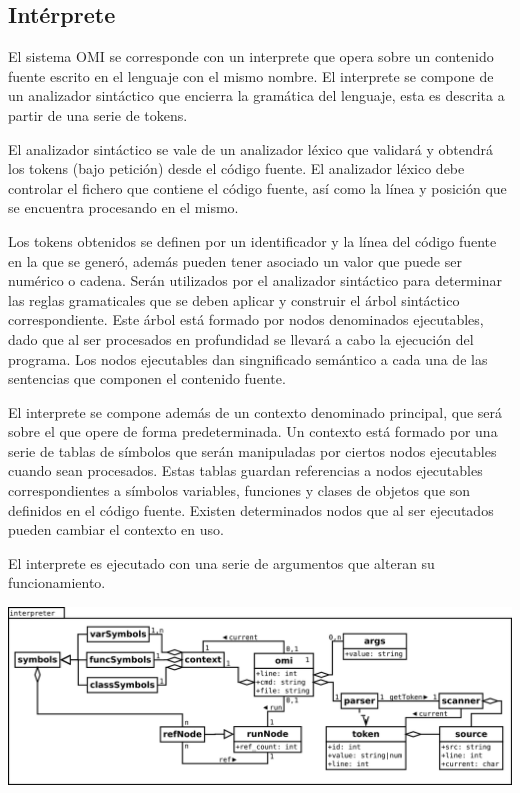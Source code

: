 \subsection{Intérprete}
El sistema OMI se corresponde con un interprete que opera sobre 
un contenido fuente escrito en el lenguaje con el mismo nombre. 
El interprete se compone de un analizador sintáctico que encierra la 
gramática del lenguaje, esta es descrita a partir de una serie de tokens.

El analizador sintáctico se vale de un analizador léxico que validará 
y obtendrá los tokens (bajo petición) desde el código fuente.
El analizador léxico debe controlar el fichero que contiene el código fuente, 
así como la línea y posición que se encuentra procesando en el mismo.

Los tokens obtenidos se definen por un identificador y la línea del código fuente en la que se generó,
además pueden tener asociado un valor que puede ser numérico o cadena. Serán utilizados 
por el analizador sintáctico para determinar las reglas gramaticales que se deben aplicar y
construir el árbol sintáctico correspondiente. Este árbol está formado 
por nodos denominados ejecutables, dado que al ser procesados en profundidad se llevará 
a cabo la ejecución del programa. Los nodos ejecutables dan singnificado semántico a 
cada una de las sentencias que componen el contenido fuente.

El interprete se compone además de un contexto denominado principal, que será sobre el que 
opere de forma predeterminada. Un contexto está formado por una serie de tablas de símbolos 
que serán manipuladas por ciertos nodos ejecutables cuando sean procesados. Estas tablas guardan 
referencias a nodos ejecutables correspondientes a símbolos variables, funciones y clases de objetos 
que son definidos en el código fuente. Existen determinados nodos que al ser ejecutados pueden 
cambiar el contexto en uso.

El interprete es ejecutado con una serie de argumentos que alteran su funcionamiento.

\begin{center}
\includegraphics[scale=0.3]{interpreter.png} \\
\end{center}
\pagebreak
